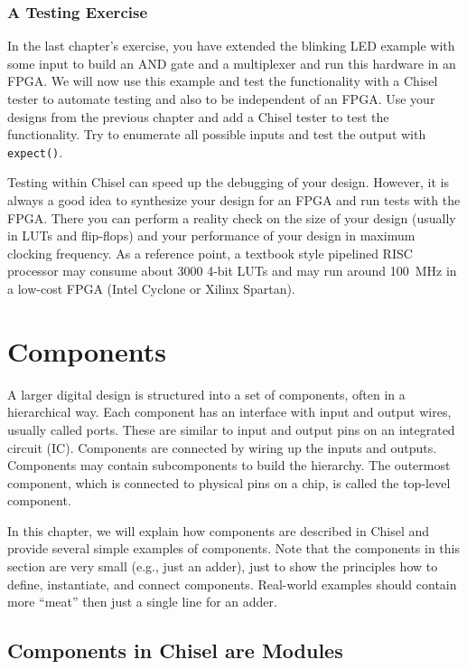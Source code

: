 \documentclass[%
    10pt,
    headinclude, footexclude,
    openright, %
    notitlepage,
    cleardoubleempty,
    headsepline,
    pointlessnumbers,
    bibtotoc, idxtotoc,
    ]{scrbook}
\newcommand{\code}[1]{{\small{\texttt{#1}}}}
\begin{document}
\subsection{A Testing Exercise}

In the last chapter's exercise, you have extended the blinking LED example with some input
to build an AND gate and a multiplexer and run this hardware in an FPGA.
We will now use this example and test the functionality with a Chisel tester
to automate testing and also to be independent of an FPGA.
Use your designs from the previous chapter and add a Chisel tester to test the functionality.
Try to enumerate all possible inputs and test the output with \code{expect()}.

Testing within Chisel can speed up the debugging of your design.
However, it is always a good idea to synthesize your design for an FPGA and run tests
with the FPGA. There you can perform a reality check on the size of your design (usually
in LUTs and flip-flops) and your performance of your design in maximum clocking frequency.
As a reference point, a textbook style pipelined RISC processor may consume about 3000
4-bit LUTs and may run around 100~MHz in a low-cost FPGA (Intel Cyclone or
Xilinx Spartan).


\chapter{Components}


A larger digital design is structured into a set of components, often in
a hierarchical way. Each component has an interface with input and output
wires, usually called ports. These are similar to input and output pins on an integrated circuit (IC).
Components are connected by wiring up the inputs and outputs.
Components may contain subcomponents to build the hierarchy.
The outermost component, which is connected to physical pins
on a chip, is called the top-level component.

In this chapter, we will explain how components are described in Chisel and
provide several simple examples of components.
Note that the components in this section are very small (e.g., just an adder),
just to show the principles how to define, instantiate, and connect components.
Real-world examples should contain more ``meat'' then just a single line for
an adder.

\section{Components in Chisel are Modules}
\end{document}
